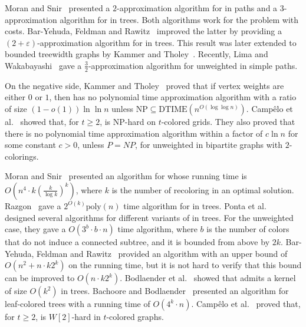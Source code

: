 
Moran and Snir~\cite{moran2007efficient} presented a $2$-approximation
algorithm for \CRP{} in paths and a $3$-approximation algorithm for \CRP{}
in trees.  
%
Both algorithms work for the problem with costs.
%
Bar-Yehuda, Feldman and Rawitz~\cite{BFR08} improved the
latter by providing a $(2+\varepsilon)$-approximation algorithm for
\CRP{} in trees.  
%
This result was later extended to bounded treewidth graphs by 
Kammer and Tholey~\cite{kammer2012complexity}.
%
Recently, Lima and Wakabayashi~\cite{lima2014convex} gave a 
$\frac{3}{2}$-approximation algorithm for unweighted \TWOCR{} in simple paths.

On the negative side, 
Kammer and Tholey~\cite{kammer2012complexity}
proved that if vertex weights are either $0$ or $1$, 
then \TWOCR{} has no polynomial time approximation algorithm with a ratio of size 
$(1 - o(1))\ln\ln n$ 
unless $\text{NP} \subseteq \text{DTIME}(n^{O(\log\log n)})$.
%
Camp\^{e}lo et al.~\cite{campelo2013complexity} showed that,
for $t \geq 2$, 
\CRP{} is NP-hard on $t$-colored grids. 
%
They also proved that there is no polynomial time approximation algorithm 
within a factor of $c\ln n$ for some constant $c > 0$, 
unless $P = NP$, 
for unweighted \CRP{} in bipartite graphs with $2$-colorings.


Moran and Snir~\cite{MoranSnir08} presented an algorithm for \CRP{}
whose running time is $O(n^4 \cdot k (\frac{k}{\log k})^k)$,
where $k$ is the number of recoloring in an optimal solution.
%
Razgon~\cite{Razgon07} gave a $2^{O(k)} \text{poly}(n)$ time algorithm for \CRP{} in trees.
%
Ponta et al.~\cite{ponta2008speeding} 
designed several algorithms for different variants of \CRP{} in trees. 
%
For the unweighted case, 
they gave a $O(3^b \cdot b \cdot n)$ time algorithm, 
where $b$ is the number of colors that do not induce a connected subtree,
and it is bounded from above by $2k$.
%  
Bar-Yehuda, Feldman and Rawitz~\cite{BFR08} 
provided an algorithm with an upper bound of $O(n^2 + n \cdot k 2^k)$ on the running time, 
but it is not hard to verify that this bound can be improved to $O(n \cdot k 2^k)$.
%
Bodlaender et al.~\cite{BFLRRW11} showed that \CRP{}  admits a kernel of size $O(k^2)$
in trees.
%
Bachoore and Bodlaender~\cite{bachoore2006convex} 
presented an algorithm for leaf-colored trees with a running time of $O(4^k \cdot n)$. 
%
Camp\^{e}lo et al.~\cite{campelo2013complexity} proved that, 
for $t \geq 2$, 
\CRP{} is $W[2]$-hard in $t$-colored graphs.


